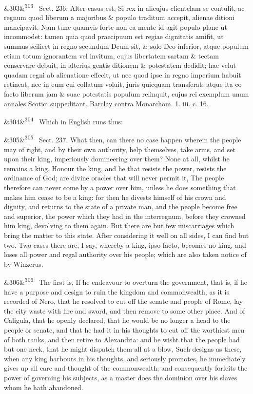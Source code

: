 \documentclass[12pt]{article}
\newcommand{\para}[1][]{\par\noindent\ifx&#1&\else\textsuperscript{\footnotesize #1}~\fi}
\begin{document}
\para[303] Sect. 236. Alter casus est, Si rex in alicujus clientelam se contulit, ac regnum quod liberum a majoribus \& populo traditum accepit, alienae ditioni mancipavit. Nam tunc quamvis forte non ea mente id agit populo plane ut incommodet: tamen quia quod praecipuum est regiae dignitatis amifit, ut summus scilicet in regno secundum Deum sit, \& solo Deo inferior, atque populum etiam totum ignorantem vel invitum, cujus libertatem sartam \& tectam conservare debuit, in alterius gentis ditionem \& potestatem dedidit; hac velut quadam regni ab alienatione effecit, ut nec quod ipse in regno imperium habuit retineat, nec in eum cui collatum voluit, juris quicquam transferat; atque ita eo facto liberum jam \& suae potestatis populum relinquit, cujus rei exemplum unum annales Scotici suppeditant. Barclay contra Monarchom. 1. iii. c. 16.

\para[304] Which in English runs thus:

\para[305] Sect. 237. What then, can there no case happen wherein the people may of right, and by their own authority, help themselves, take arms, and set upon their king, imperiously domineering over them? None at all, whilst he remains a king. Honour the king, and he that resists the power, resists the ordinance of God; are divine oracles that will never permit it, The people therefore can never come by a power over him, unless he does something that makes him cease to be a king: for then he divests himself of his crown and dignity, and returns to the state of a private man, and the people become free and superior, the power which they had in the interregnum, before they crowned him king, devolving to them again. But there are but few miscarriages which bring the matter to this state. After considering it well on all sides, I can find but two. Two cases there are, I say, whereby a king, ipso facto, becomes no king, and loses all power and regal authority over his people; which are also taken notice of by Winzerus.

\para[306] The first is, If he endeavour to overturn the government, that is, if he have a purpose and design to ruin the kingdom and commonwealth, as it is recorded of Nero, that he resolved to cut off the senate and people of Rome, lay the city waste with fire and sword, and then remove to some other place. And of Caligula, that he openly declared, that he would be no longer a head to the people or senate, and that he had it in his thoughts to cut off the worthiest men of both ranks, and then retire to Alexandria: and he wisht that the people had but one neck, that he might dispatch them all at a blow, Such designs as these, when any king harbours in his thoughts, and seriously promotes, he immediately gives up all care and thought of the commonwealth; and consequently forfeits the power of governing his subjects, as a master does the dominion over his slaves whom he hath abandoned.
\end{document}
